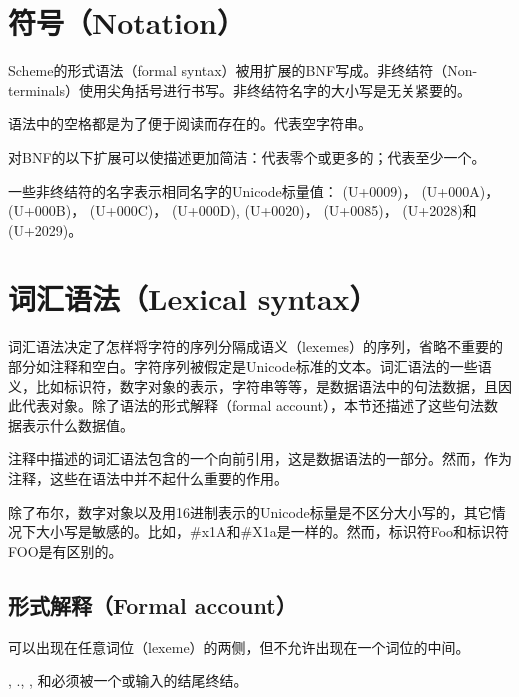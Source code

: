\section{符号（Notation）}
\label{BNF}

Scheme的形式语法（formal syntax）被用扩展的BNF写成。非终结符（Non-terminals）使用尖角括号进行书写。非终结符名字的大小写是无关紧要的。

语法中的空格都是为了便于阅读而存在的。代表空字符串。

对BNF的以下扩展可以使描述更加简洁：代表零个或更多的；代表至少一个。

一些非终结符的名字表示相同名字的Unicode标量值： (U+0009)， (U+000A)， (U+000B)， (U+000C)， (U+000D),
 (U+0020)， (U+0085)， (U+2028)和 (U+2029)。

\section{词汇语法（Lexical syntax）}
\label{lexicalsyntaxsection}

词汇语法决定了怎样将字符的序列分隔成语义（lexemes）的序列，省略不重要的部分如注释和空白。字符序列被假定是Unicode标准\cite{Unicode}的文本。词汇语法的一些语义，比如标识符，数字对象的表示，字符串等等，是数据语法中的句法数据，且因此代表对象。除了语法的形式解释（formal account），本节还描述了这些句法数据表示什么数据值。

注释中描述的词汇语法包含的一个向前引用，这是数据语法的一部分。然而，作为注释，这些在语法中并不起什么重要的作用。

除了布尔，数字对象以及用16进制表示的Unicode标量是不区分大小写的，其它情况下大小写是敏感的。比如，{\cf \#x1A}和{\cf \#X1a}是一样的。然而，标识符{\cf Foo}和标识符{\CF FOO}是有区别的。

\subsection{形式解释（Formal account）}
\label{lexicalgrammarsection}

可以出现在任意词位（lexeme）的两侧，但不允许出现在一个词位的中间。

, {\cf .}, , 和必须被一个或输入的结尾终结。

